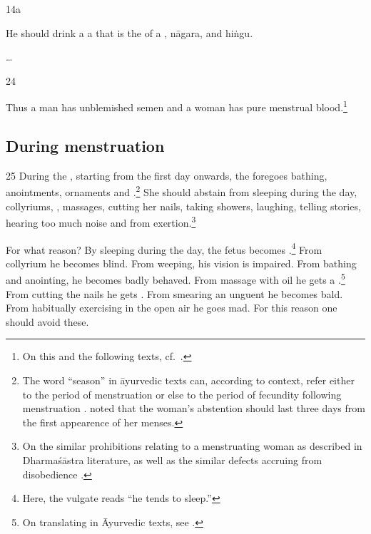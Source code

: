 \begin{translation}
 \item[14a] 
 
 He should drink a a  that is the
 of  a , \gls{nāgara},
and \gls{hiṅgu}.
 
\item[\ldots] 
 
\item[24]

Thus a man has unblemished semen and a woman has pure menstrual 
blood.\footnote{On this and the following texts, cf.\ \cite[389 et 
passim]{smet-2010}.}
 
 \subsection{During menstruation}
 
 \item[25]
 \label{3.2.25}
During the , starting from the first day onwards, the
 foregoes bathing, anointments,
ornaments and .\footnote{The word 
    “season” in āyurvedic texts can, according to context, refer either to
    the period of menstruation or else to the period of fecundity
    following menstruation \citep[15\,ff., note 27, \emph{et
    passim}]{das-2003}.  noted that the woman's
    abstention should last three days from the first appearence of her
    menses.} She should abstain from sleeping during the day, collyriums,
    , massages, cutting her nails, taking
    showers, laughing, telling stories, hearing too much noise and from
    exertion.\footnote{On the similar prohibitions relating to a
        menstruating woman as described in Dharmaśāstra literature, as well as
        the similar defects accruing from disobedience         
        \citep[see][284--287]{lesl-1989}.}
        
For what reason?  By sleeping during the day, the fetus becomes
.\footnote{Here, the vulgate reads  “he
    tends to sleep.”} From collyrium he becomes blind.  From weeping, his
    vision is impaired. From bathing and anointing, he becomes badly
    behaved. From massage with oil he gets a .\footnote{On translating  in Āyurvedic texts, see
        \cite[96\,ff]{emme-1984}.} From cutting the nails he gets
        .  From smearing an unguent he becomes bald.
        From habitually exercising in the open air he goes mad. For this
        reason one should avoid these.
    

\end{translation}
